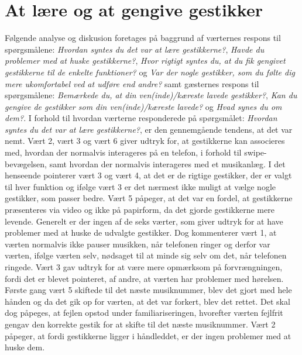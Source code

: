 \section{At lære og at gengive gestikker}
\label{TestresultaterSocialAcceptGestikker}
%
Følgende analyse og diskusion foretages på baggrund af værternes respons til spørgsmålene: \textit{Hvordan syntes du det var at lære gestikkerne?}, \textit{Havde du problemer med at huske gestikkerne?}, \textit{Hvor rigtigt syntes du, at du fik gengivet gestikkerne til de enkelte funktioner?} og \textit{Var der nogle gestikker, som du følte dig mere ukomfortabel ved at udføre end andre?} samt gæsternes respons til spørgsmålene: \textit{Bemærkede du, at din ven(inde)/kæreste lavede gestikker?}, \textit{Kan du gengive de gestikker som din ven(inde)/kæreste lavede?} og \textit{Hvad synes du om dem?}.\blankline
%
I forhold til hvordan værterne responderede på spørgsmålet: \textit{Hvordan syntes du det var at lære gestikkerne?}, er den gennemgående tendens, at det var nemt. Vært 2, vært 3 og vært 6 giver udtryk for, at gestikkerne kan associeres med, hvordan der normalvis interageres på en telefon, i forhold til swipe-bevægelsen, samt hvordan der normalvis interageres med et musikanlæg. I det henseende pointerer vært 3 og vært 4, at det er de rigtige gestikker, der er valgt til hver funktion og ifølge vært 3 er det nærmest ikke muligt at vælge nogle gestikker, som passer bedre. Vært 5 påpeger, at det var en fordel, at gestikkerne præsenteres via video og ikke på papirform, da det gjorde gestikkerne mere levende. Generelt er der ingen af de seks værter, som giver udtryk for at have problemer med at huske de udvalgte gestikker. Dog kommenterer vært 1, at værten normalvis ikke pauser musikken, når telefonen ringer og derfor var værten, ifølge værten selv, nødsaget til at minde sig selv om det, når telefonen ringede. Vært 3 gav udtryk for at være mere opmærksom på forvrængningen, fordi det er blevet pointeret, af andre, at værten har problemer med hørelsen. Første gang vært 5 skiftede til det næste musiknummer, blev det gjort med hele hånden og da det gik op for værten, at det var forkert, blev det rettet. Det skal dog påpeges, at fejlen opstod under familiariseringen, hvorefter værten fejlfrit gengav den korrekte gestik for at skifte til det næste musiknummer. Vært 2 påpeger, at fordi gestikkerne ligger i håndleddet, er der ingen problemer med at huske dem. 

